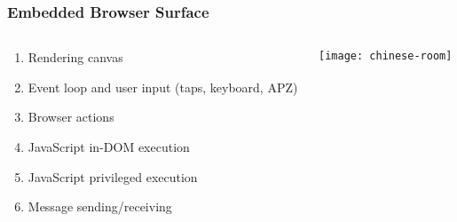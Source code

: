 \documentclass[
	notes=none,
	aspectratio=169
]{beamer}
\begin{document}

\begin{frame}
\frametitle{Embedded Browser Surface}

\begin{columns}[T]
\begin{column}[T]{0.7\textwidth}
\setlength{\parskip}{0.5em}

\vspace{1.0cm}
\begin{enumerate}
\setlength{\parskip}{0.5em}
\item Rendering canvas
\item Event loop and user input (taps, keyboard, APZ)
\item Browser actions
\item JavaScript in-DOM execution
\item JavaScript privileged execution
\item Message sending/receiving
\end{enumerate}

\end{column}
\begin{column}[T]{0.3\textwidth}
\setlength{\parskip}{0.5em}

\vspace{0.5cm}
\texttt{[image: chinese-room]}

\end{column}
\end{columns}

\end{frame}

\end{document}
